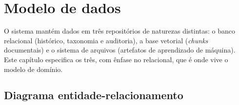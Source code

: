 \chapter{Modelo de dados}
\label{cap:modelodados}

O sistema mantém dados em três repositórios de naturezas distintas: o banco
relacional (histórico, taxonomia e auditoria), a base vetorial (\textit{chunks}
documentais) e o sistema de arquivos (artefatos de aprendizado de máquina).
Este capítulo especifica os três, com ênfase no relacional, que é onde vive o
modelo de domínio.

\section{Diagrama entidade-relacionamento}

